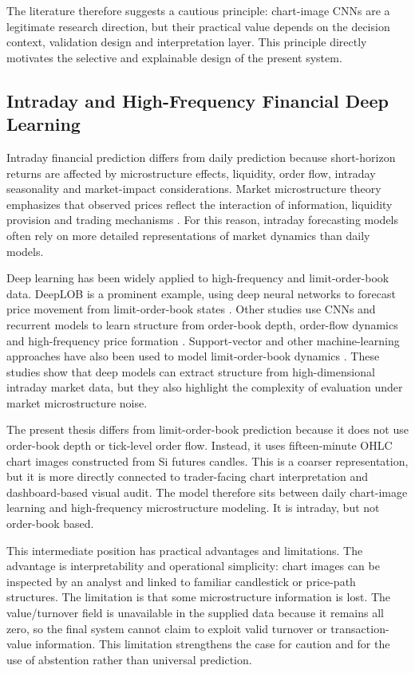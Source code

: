 The literature therefore suggests a cautious principle: chart-image CNNs are a legitimate research direction, but their practical value depends on the decision context, validation design and interpretation layer. This principle directly motivates the selective and explainable design of the present system.

\subsection{Intraday and High-Frequency Financial Deep Learning}
\label{subsec:intraday_hft}

Intraday financial prediction differs from daily prediction because short-horizon returns are affected by microstructure effects, liquidity, order flow, intraday seasonality and market-impact considerations. Market microstructure theory emphasizes that observed prices reflect the interaction of information, liquidity provision and trading mechanisms \cite{ohara_microstructure}. For this reason, intraday forecasting models often rely on more detailed representations of market dynamics than daily models.

Deep learning has been widely applied to high-frequency and limit-order-book data. DeepLOB is a prominent example, using deep neural networks to forecast price movement from limit-order-book states \cite{deeplob}. Other studies use CNNs and recurrent models to learn structure from order-book depth, order-flow dynamics and high-frequency price formation \cite{zhang_lob_cnn,tsantekidis_lob,sirignano_cont_universal}. Support-vector and other machine-learning approaches have also been used to model limit-order-book dynamics \cite{kercheval_lob_svm}. These studies show that deep models can extract structure from high-dimensional intraday market data, but they also highlight the complexity of evaluation under market microstructure noise.

The present thesis differs from limit-order-book prediction because it does not use order-book depth or tick-level order flow. Instead, it uses fifteen-minute OHLC chart images constructed from Si futures candles. This is a coarser representation, but it is more directly connected to trader-facing chart interpretation and dashboard-based visual audit. The model therefore sits between daily chart-image learning and high-frequency microstructure modeling. It is intraday, but not order-book based.

This intermediate position has practical advantages and limitations. The advantage is interpretability and operational simplicity: chart images can be inspected by an analyst and linked to familiar candlestick or price-path structures. The limitation is that some microstructure information is lost. The value/turnover field is unavailable in the supplied data because it remains all zero, so the final system cannot claim to exploit valid turnover or transaction-value information. This limitation strengthens the case for caution and for the use of abstention rather than universal prediction.

